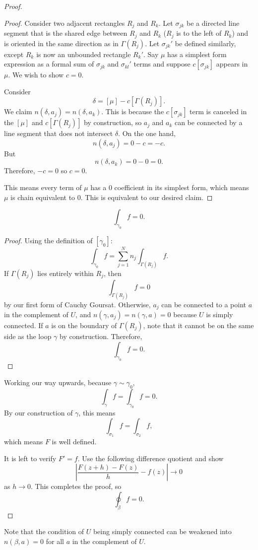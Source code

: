 \begin{proof}
\begin{proof}
        Consider two adjacent rectangles $R_j$ and $R_k$.
        Let $\sigma_{jk}$ be a directed line segment 
        that is the shared edge between $R_j$ and $R_k$
        ($R_j$ is to the left of $R_k$) and
        is oriented in the same direction as in $\Gamma(R_j)$.
        Let $\sigma_{jk}'$ be defined similarly, except
        $R_k$ is now an unbounded rectangle $R_k'$.
        Say $\mu$ has a simplest form expression as a formal
        sum of $\sigma_{jk}$ and $\sigma_{kl}'$ terms and
        suppose $c[\sigma_{jk}]$ appears in $\mu$.
        We wish to show $c=0$.
        
        Consider
        \[ \delta = [\mu] - c[\Gamma(R_j)]. \]
        We claim $n(\delta, a_j) = n(\delta, a_k)$.
        This is because the $c[\sigma_{jk}]$ term is canceled
        in the $[\mu]$ and $c[\Gamma(R_j)]$ by construction,
        so $a_j$ and $a_k$ can be connected by a line segment
        that does not intersect $\delta$.
        On the one hand, 
        \[ n(\delta, a_j) = 0 - c = -c. \]
        But
        \[ n(\delta, a_k) = 0 - 0 = 0. \]
        Therefore, $-c = 0$ so $c = 0$.

        This means every term of $\mu$ has a $0$ coefficient
        in its simplest form, which means $\mu$ is chain 
        equivalent to $0$.
        This is equivalent to our desired claim.
    \end{proof}
    \begin{claim*}
        \[ \int_{\gamma_0} f = 0. \]
    \end{claim*}
    \begin{proof}
        Using the definition of $[\gamma_0]$:
        \[ \int_{\gamma_0} f = \sum_{j=1}^N n_j \int_{\Gamma(R_j)}
        f. \]
        If $\Gamma(R_j)$ lies entirely within $R_j$, then
        \[ \int_{\Gamma(R_j)} f = 0 \]
        by our first form of Cauchy Goursat.
        Otherwise, $a_j$ can be connected to a point $a$
        in the complement of $U$, and $n(\gamma, a_j) = n(\gamma
        , a) = 0$ because $U$ is simply connected.
        If $a$ is on the boundary of $\Gamma(R_j)$, note that
        it cannot be on the same side as the loop $\gamma$
        by construction.
        Therefore,
        \[ \int_{\gamma_0} f = 0. \]
    \end{proof}
    Working our way upwards, because $\gamma \sim \gamma_0$,
    \[ \int_{\gamma} f = \int_{\gamma_0} f = 0. \]
    By our construction of $\gamma$, this means
    \[ \int_{\sigma_1} f = \int_{\sigma_2} f, \]
    which means $F$ is well defined.

    It is left to verify $F' = f$.
    Use the following difference quotient and show
    \[ \left| \frac{F(z+h)-F(z)}{h} - f(z) \right| \to 0 \]
    as $h \to 0$.
    This completes the proof, so
    \[ \oint_{\beta} f = 0. \]
\end{proof}

Note that the condition of $U$ being simply connected can
be weakened into $n(\beta, a) = 0$ for all $a$ in the complement
of $U$.


